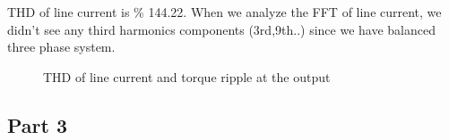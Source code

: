 \documentclass[fleqn, a4paper]{report}
\begin{document}
THD of line current is \% 144.22. When we analyze the FFT of line current, we didn't see any third harmonics components (3rd,9th..) since we have balanced three phase system. 
\begin{figure}[H]%
    \centering
    \qquad
    \caption{THD of line current and torque ripple at the output}%
    \label{fig:example}%
\end{figure}
\subsection*{Part 3}
\end{document}
